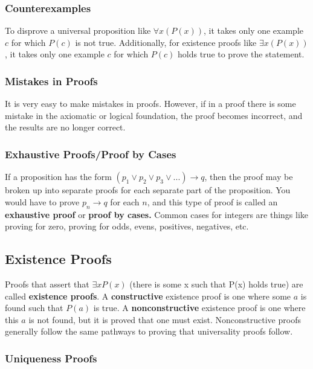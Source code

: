 \documentclass[12pt,letterpaper]{article}
\begin{document}
\subsubsection{Counterexamples}

To disprove a universal proposition like $\forall x(P(x))$, it takes only one example $c$ for which $P(c)$ is not true. Additionally, for existence proofs like $\exists x(P(x))$, it takes only one example $c$ for which $P(c)$ holds true to prove the statement.

\subsubsection{Mistakes in Proofs}

It is very easy to make mistakes in proofs. However, if in a proof there is some mistake in the axiomatic or logical foundation, the proof becomes incorrect, and the results are no longer correct.

\subsubsection{Exhaustive Proofs/Proof by Cases}

If a proposition has the form $\left(p_{1} \vee p_{2} \vee p_{3} \vee ... \right) \rightarrow q$, then the proof may be broken up into separate proofs for each separate part of the proposition. You would have to prove $p_{n} \rightarrow q$ for each $n$, and this type of proof is called an \textbf{exhaustive proof} or \textbf{proof by cases.} Common cases for integers are things like proving for zero, proving for odds, evens, positives, negatives, etc. 

\subsection{Existence Proofs}

Proofs that assert that $\exists x P(x)$ (there is some x such that P(x) holds true) are called \textbf{existence proofs}. A \textbf{constructive} existence proof is one where some $a$ is found such that $P(a)$ is true. A \textbf{nonconstructive} existence proof is one where this $a$ is not found, but it is proved that one must exist. Nonconstructive proofs generally follow the same pathways to proving that universality proofs follow.

\subsubsection{Uniqueness Proofs}
\end{document}
